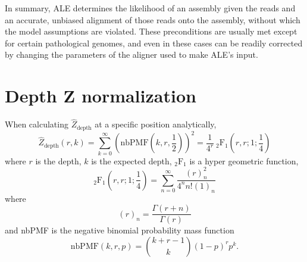 \documentclass[phd,tocprelim]{cornell}
\begin{document}
In summary, ALE determines the likelihood of an assembly given the reads and an accurate, unbiased alignment of those reads onto the assembly, without which the model assumptions are violated. These preconditions are usually met except for certain pathological genomes, and even in these cases can be readily corrected by changing the parameters of the aligner used to make ALE's input.


\section{Depth Z normalization} %
\label{sec:DepthZnormalization}

When calculating $\hat{Z}_{\text{depth}}$ at a specific position analytically,
\begin{equation}
    \hat{Z}_{\text{depth}}(r,k) = \sum_{k=0}^{\infty} \left(\mbox{nbPMF}\left(k,r,\frac{1}{2}\right)\right)^{2} = \frac{1}{4^{r}} \ _{2}\mbox{F}_{1}\left(r,r;1;\frac{1}{4}\right)
\end{equation}
where $r$ is the depth, $k$ is the expected depth, $_{2}\mbox{F}_{1}$ is a hyper geometric function,
\begin{equation}
    _{2}\mbox{F}_{1}\left(r,r;1;\frac{1}{4}\right) = \sum_{n=0}^{\infty} \frac{(r)^{2}_{n}}{4^{n}n!(1)_{n}}
\end{equation}
where
\begin{equation}
    (r)_{n} = \frac{\Gamma(r+n)}{\Gamma(r)}    
\end{equation}
and nbPMF is the negative binomial probability mass function
\begin{equation}
    \mbox{nbPMF}\left(k,r,p\right) = {k+r-1 \choose k} (1-p)^{r}p^{k}.
\end{equation}
\end{document}
